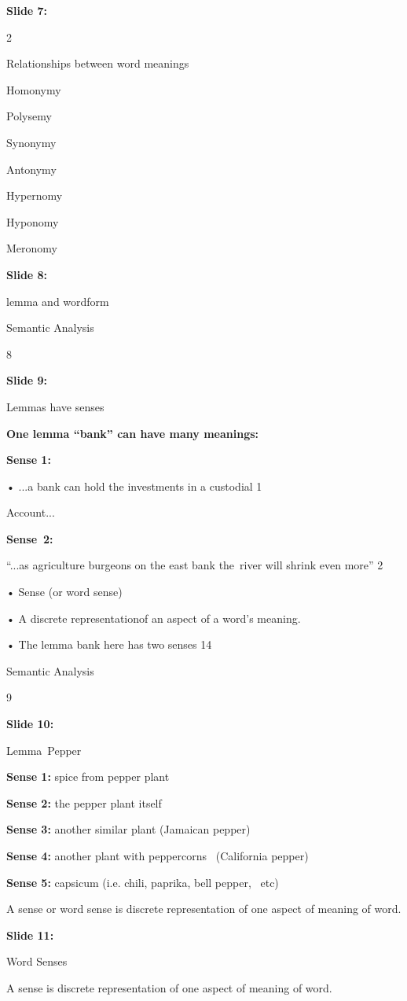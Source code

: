\documentclass[11pt,a4paper]{article}
\begin{document}
\textbf{Slide 7:}

2

Relationships between word  meanings

Homonymy

Polysemy

Synonymy

Antonymy

Hypernomy

Hyponomy

Meronomy

\textbf{Slide 8:}

lemma and wordform

Semantic Analysis

8

\textbf{Slide 9:}

Lemmas have senses

\textbf{One lemma “bank” can have many meanings:} 

\textbf{Sense 1:} 

• ...a bank can hold the investments in a custodial 1

Account...

\textbf{Sense 2:} 

“...as agriculture burgeons on the east bank the river will shrink even more” 2

• Sense (or word sense)

• A discrete representationof an aspect of a word’s meaning.

• The lemma bank here has two senses 14

Semantic Analysis

9

\textbf{Slide 10:}

Lemma Pepper

\textbf{Sense 1:}  spice from pepper plant

\textbf{Sense 2:}  the pepper plant itself

\textbf{Sense 3:}  another similar plant (Jamaican pepper)

\textbf{Sense 4:}  another plant with peppercorns  (California pepper)

\textbf{Sense 5:}  capsicum (i.e. chili, paprika, bell pepper,  etc)

A sense or word sense is discrete representation of one aspect of  meaning of word.

\textbf{Slide 11:}

Word Senses

A sense is discrete representation of one aspect of meaning of  word.
\end{document}

